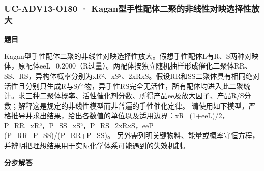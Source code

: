 \documentclass[UTF8,11pt,a4paper]{ctexart}
\begin{document}
\subsubsection*{UC-ADV13-O180 · Kagan型手性配体二聚的非线性对映选择性放大}
\noindent\textbf{题目}\par
Kagan型手性配体二聚的非线性对映选择性放大。假想手性配体L有R、S两种对映体，原配体eeL=0.2000（R过量）。两配体按独立随机抽样形成催化二聚体RR、SS、RS，异构体概率分别为xR²、xS²、2xRxS。假设RR和SS二聚体具有相同绝对活性且分别只生成R与S产物，异手性RS完全无活性，所有配体均进入此二聚统计。求三种二聚体概率、活性催化剂分数、所得产品ee及放大因子、产品R/S分数；解释这是规定的非线性模型而非普遍的手性催化定律。 请使用如下模型，严格推导并求出结果，给出各数值的单位以及适用边界：xR=(1+eeL)/2，P\_RR=xR²，P\_SS=xS²，P\_RS=2xRxS，eeP=(P\_RR−P\_SS)/(P\_RR+P\_SS)。 另外需列明关键物料、能量或概率守恒方程，并辨明把理想结果用于实际化学体系可能遇到的失效机制。\par
\medskip\noindent\textbf{分步解答}
\end{document}
